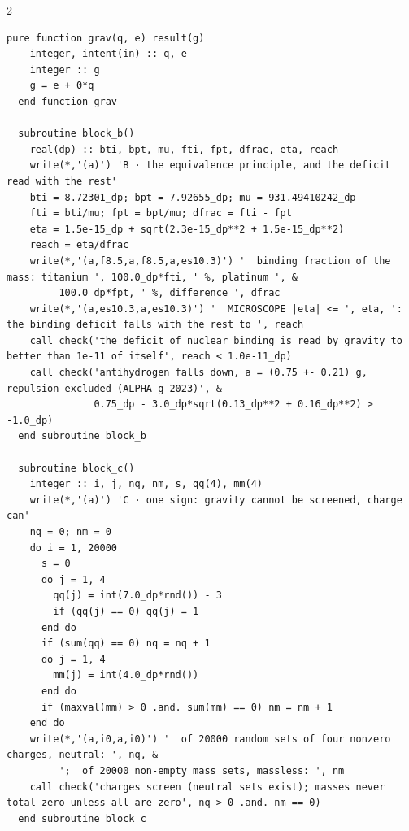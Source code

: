 \documentclass[10pt]{article}
\begin{document}
\begin{multicols}{2}
\begin{Verbatim}[fontsize=\fontsize{5.9}{6.8}\selectfont,breaklines,breakanywhere,breaksymbolleft={}]
  pure function grav(q, e) result(g)
    integer, intent(in) :: q, e
    integer :: g
    g = e + 0*q
  end function grav

  subroutine block_b()
    real(dp) :: bti, bpt, mu, fti, fpt, dfrac, eta, reach
    write(*,'(a)') 'B · the equivalence principle, and the deficit read with the rest'
    bti = 8.72301_dp; bpt = 7.92655_dp; mu = 931.49410242_dp
    fti = bti/mu; fpt = bpt/mu; dfrac = fti - fpt
    eta = 1.5e-15_dp + sqrt(2.3e-15_dp**2 + 1.5e-15_dp**2)
    reach = eta/dfrac
    write(*,'(a,f8.5,a,f8.5,a,es10.3)') '  binding fraction of the mass: titanium ', 100.0_dp*fti, ' %, platinum ', &
         100.0_dp*fpt, ' %, difference ', dfrac
    write(*,'(a,es10.3,a,es10.3)') '  MICROSCOPE |eta| <= ', eta, ': the binding deficit falls with the rest to ', reach
    call check('the deficit of nuclear binding is read by gravity to better than 1e-11 of itself', reach < 1.0e-11_dp)
    call check('antihydrogen falls down, a = (0.75 +- 0.21) g, repulsion excluded (ALPHA-g 2023)', &
               0.75_dp - 3.0_dp*sqrt(0.13_dp**2 + 0.16_dp**2) > -1.0_dp)
  end subroutine block_b

  subroutine block_c()
    integer :: i, j, nq, nm, s, qq(4), mm(4)
    write(*,'(a)') 'C · one sign: gravity cannot be screened, charge can'
    nq = 0; nm = 0
    do i = 1, 20000
      s = 0
      do j = 1, 4
        qq(j) = int(7.0_dp*rnd()) - 3
        if (qq(j) == 0) qq(j) = 1
      end do
      if (sum(qq) == 0) nq = nq + 1
      do j = 1, 4
        mm(j) = int(4.0_dp*rnd())
      end do
      if (maxval(mm) > 0 .and. sum(mm) == 0) nm = nm + 1
    end do
    write(*,'(a,i0,a,i0)') '  of 20000 random sets of four nonzero charges, neutral: ', nq, &
         ';  of 20000 non-empty mass sets, massless: ', nm
    call check('charges screen (neutral sets exist); masses never total zero unless all are zero', nq > 0 .and. nm == 0)
  end subroutine block_c


\end{Verbatim}
\end{multicols}
\end{document}

